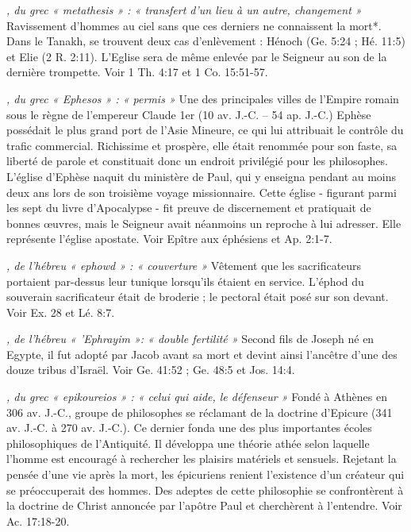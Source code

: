 \begin{multicols}{2}
\textit{, du grec « metathesis » : « transfert d'un lieu à un autre, changement »}\newline
Ravissement d'hommes au ciel sans que ces derniers ne connaissent la mort*. Dans le Tanakh, se trouvent deux cas d'enlèvement : Hénoch (Ge. 5:24 ; Hé. 11:5) et Elie (2 R. 2:11). L'Eglise sera de même enlevée par le Seigneur au son de la dernière trompette. Voir 1 Th. 4:17 et 1 Co. 15:51-57.

\textit{, du grec « Ephesos » : « permis »}\newline
Une des principales villes de l'Empire romain sous le règne de l'empereur Claude 1er (10 av. J.-C. – 54 ap. J.-C.) Ephèse possédait le plus grand port de l'Asie Mineure, ce qui lui attribuait le contrôle du trafic commercial. Richissime et prospère, elle était renommée pour son faste, sa liberté de parole et constituait donc un endroit privilégié pour les philosophes. L'église d'Ephèse naquit du ministère de Paul, qui y enseigna pendant au moins deux ans lors de son troisième voyage missionnaire. Cette église - figurant parmi les sept du livre d'Apocalypse - fit preuve de discernement et pratiquait de bonnes œuvres, mais le Seigneur avait néanmoins un reproche à lui adresser. Elle représente l'église apostate. Voir Epître aux éphésiens et Ap. 2:1-7.

\textit{, de l'hébreu « ephowd » : « couverture »}\newline
Vêtement que les sacrificateurs portaient par-dessus leur tunique lorsqu'ils étaient en service. L'éphod du souverain sacrificateur était de broderie ; le pectoral était posé sur son devant. Voir Ex. 28 et Lé. 8:7.

\textit{, de l'hébreu « 'Ephrayim »: « double fertilité »}\newline
Second fils de Joseph né en Egypte, il fut adopté par Jacob avant sa mort et devint ainsi l'ancêtre d'une des douze tribus d'Israël. Voir Ge. 41:52 ; Ge. 48:5 et Jos. 14:4.

\textit{, du grec « epikoureios » : « celui qui aide, le défenseur »}\newline
Fondé à Athènes en 306 av. J.-C., groupe de philosophes se réclamant de la doctrine d'Epicure (341 av. J.-C. à 270 av. J.-C.). Ce dernier fonda une des plus importantes écoles philosophiques de l'Antiquité. Il développa une théorie athée selon laquelle l'homme est encouragé à rechercher les plaisirs matériels et sensuels. Rejetant la pensée d'une vie après la mort, les épicuriens renient l'existence d'un créateur qui se préoccuperait des hommes. Des adeptes de cette philosophie se confrontèrent à la doctrine de Christ annoncée par l'apôtre Paul et cherchèrent à l'entendre. Voir Ac. 17:18-20.


\end{multicols}
